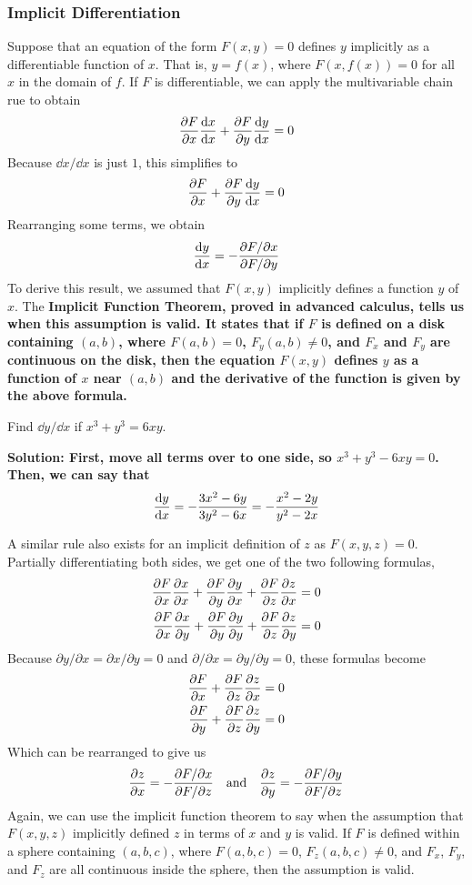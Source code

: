 \subsubsection{Implicit Differentiation}
Suppose that an equation of the form \(F(x,y)=0\) defines \(y\) implicitly as a differentiable function of \(x\). That is, \(y=f(x)\), where \(F(x, f(x))=0\) for all \(x\) in the domain of \(f\). If \(F\) is differentiable, we can apply the multivariable chain rue to obtain
\[ \pdv{F}{x}\dv{x}{x} + \pdv{F}{y}\dv{y}{x} = 0 \]
Because \(\dd x/\dd x\) is just \(1\), this simplifies to
\[ \pdv{F}{x} + \pdv{F}{y}\dv{y}{x} = 0\]
Rearranging some terms, we obtain
\[ \dv{y}{x} = -\frac{\partial F/\partial x}{\partial F/\partial y} \]
To derive this result, we assumed that \(F(x,y)\) implicitly defines a function \(y\) of \(x\). The \bf{Implicit Function Theorem}, proved in advanced calculus, tells us when this assumption is valid. It states that if \(F\) is defined on a disk containing \((a,b)\), where \(F(a,b)=0\), \(F_y(a,b)\neq 0\), and \(F_x\) and \(F_y\) are continuous on the disk, then the equation \(F(x,y)\) defines \(y\) as a function of \(x\) near \((a, b)\) and the derivative of the function is given by the above formula. 
\begin{example}
Find \(\dd y/\dd x\) if \(x^3+y^3=6xy\).\par\bf{Solution: }First, move all terms over to one side, so \(x^3+y^3-6xy=0\). Then, we can say that
\[ \dv{y}{x} = -\frac{3x^2-6y}{3y^2-6x} = -\frac{x^2-2y}{y^2-2x}\]
\end{example}
A similar rule also exists for an implicit definition of \(z\) as \(F(x,y,z)=0\). Partially differentiating both sides, we get one of the two following formulas,
\begin{align*}
\pdv{F}{x}\pdv{x}{x}+\pdv{F}{y}\pdv{y}{x}+\pdv{F}{z}\pdv{z}{x} &= 0 \\
\pdv{F}{x}\pdv{x}{y}+\pdv{F}{y}\pdv{y}{y}+\pdv{F}{z}\pdv{z}{y} &= 0
\end{align*}
Because \(\partial y/\partial x = \partial x/\partial y = 0\) and \(\partial /\partial x =\partial y/\partial y = 0\), these formulas become
\begin{align*}
\pdv{F}{x}+\pdv{F}{z}\pdv{z}{x} &= 0 \\
\pdv{F}{y}+\pdv{F}{z}\pdv{z}{y} &= 0
\end{align*}
Which can be rearranged to give us 
\[ \pdv{z}{x} = -\frac{\partial F/\partial x}{\partial F/\partial z}\quad\text{and}\quad \pdv{z}{y} = -\frac{\partial F/\partial y}{\partial F/\partial z}\]
Again, we can use the implicit function theorem to say when the assumption that \(F(x,y,z)\) implicitly defined \(z\) in terms of \(x\) and \(y\) is valid. If \(F\) is defined within a sphere containing \((a,b,c)\), where \(F(a,b,c)=0\), \(F_z(a,b,c)\neq 0\), and \(F_x\), \(F_y\), and \(F_z\) are all continuous inside the sphere, then the assumption is valid.
